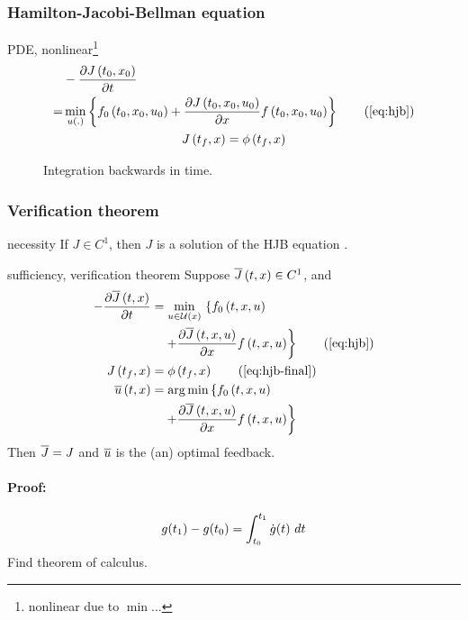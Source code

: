 \subsubsection{Hamilton-Jacobi-Bellman equation}
PDE, nonlinear\footnote{nonlinear due to $\min \dots$}
\begin{gather}
\begin{align}
&- \pdein{J \paren{t_0,x_0}}{t} \nonumber \\
    = &\min_{u(.)}  \set{
    f_0 \paren{\txuo}
    + \pdein{J \paren{\txuo}}{x}f \paren{\txuo}
    }
\tag{\ref{eq:hjb}} 
\end{align}\\
    J \paren{t_f,x} = \phi \paren{t_f,x}
    \label{eq:hjb-final}
\end{gather}
    
\begin{figure}[H]
Integration backwards in time.
    \centering
    \def\svgwidth{\columnwidth}
    \footnotesize
    
    \label{fig:integration-backwards}
\end{figure}

\subsubsection{Verification theorem}
\begin{theorem}{necessity}
If $J \in C^1$, then $J$ is a solution
of the HJB equation .
\end{theorem}

\begin{theorem}{{sufficiency, verification theorem}}
Suppose $\Jbar{t,x} \in C^1$, and 
    \begin{align}
    - \pdein{\Jbar{t,x}}{t} &= \minux{} \left\lbrace f_0 \paren{\txu} \right. \nonumber \\
    &\quad \left. + \pdein{\Jbar{\txu}}{x} f \paren{\txu} \right\rbrace \tag{\ref{eq:hjb}} \\
    J \paren{t_f,x} &= \phi \paren{t_f,x}
    \tag{\ref{eq:hjb-final}}\\
    \ubar{t,x} &= \argmin \left\lbrace
        f_0 \paren{\txu} \right. \nonumber\\
        & \quad \left. + \pdein{\Jbar{\txu}}{x}f \paren{\txu} \right\rbrace
    \end{align}
Then $\Jbar{} = J$ and $\ubar{}$ is the (an) optimal feedback.
\end{theorem}

\paragraph{Proof:}
\begin{align*}
    g(t_1) - g(t_0) = \int_{t_0}^{t_1} \dot{g}(t) ~dt
\end{align*}
Find theorem of calculus.\\

